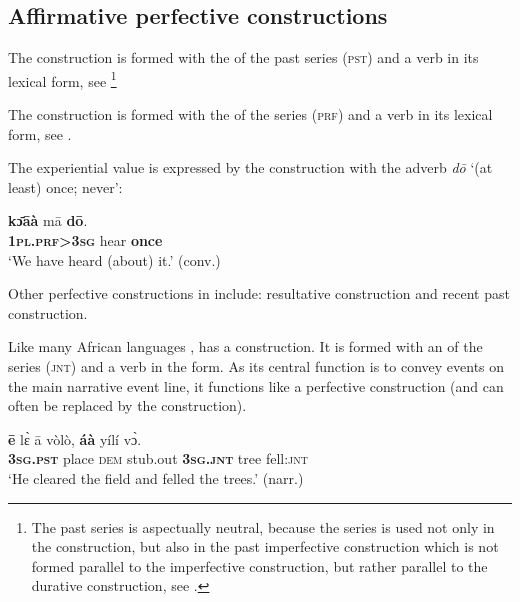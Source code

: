 \documentclass[output=paper,newtxmath,modfonts,nonflat,hidelinks]{langsci/langscibook}
\begin{document}
\subsection{Affirmative perfective constructions}
\label{khachsecaffp}

The  construction is formed with the  of the past series (\textsc{pst}) and a verb in its lexical form, see \footnote{The past  series is aspectually neutral, because the series is used not only in the  construction, but also in the past imperfective construction which is not formed parallel to the imperfective construction, but rather parallel to the durative construction, see \citet[195-196]{khachgramm}.}

The  construction is formed with the  of the  series (\textsc{prf}) and a verb in its lexical form, see .


The experiential value is expressed by the  construction with the adverb \textit{dō} ‘(at least) once; never’:

\begin{exe}\ex
\gll	\textbf{kɔ̄āà}	mā	\textbf{dō}.	\\
	\textbf{1\textsc{pl}.\textsc{prf}>3\textsc{sg}}	hear	\textbf{once}	\\			
\glt ‘We have heard (about) it.’ (conv.)
\end{exe}

Other perfective constructions in  include: resultative construction and recent past construction.

Like many African languages \citep{khachcarlson1992},  has a  construction. It is formed with an  of the  series (\textsc{jnt}) and a verb in the  form. As its central function is to convey events on the main narrative event line, it functions like a perfective construction (and can often be replaced by the  construction).

\begin{exe} \ex
\gll \textbf{ē}      lɛ̀      ā vòlò, \textbf{áà}  yílí     vɔ̀.\\
 \textbf{3\textsc{sg.pst}} place      \textsc{dem} stub.out \textbf{3\textsc{sg}.\textsc{jnt}} tree   fell:\textsc{jnt}\\
\glt `He cleared the field and felled the trees.' (narr.)
\end{exe}
\end{document}
